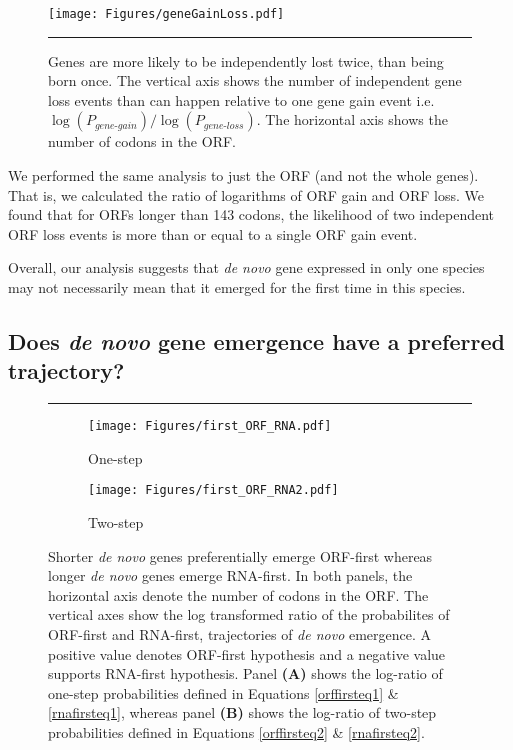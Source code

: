 \documentclass[12pt,a4paper]{article}
\begin{document}
\begin{figure}[!t]
\centering
\texttt{[image: Figures/geneGainLoss.pdf]}
\caption{Genes are more likely to be independently lost twice, than being born once. The vertical axis shows the number of independent gene loss events than can happen relative to one gene gain event i.e. $\log(P_\textit{gene-gain})/\log(P_\textit{gene-loss})$. The horizontal axis shows the number of codons in the ORF.}
\label{gainlossprob}

\vspace{1em}
\hrule
\end{figure}

We performed the same analysis to just the ORF (and not the whole genes). That is, we calculated the ratio of logarithms of ORF gain and ORF loss. We found that for ORFs longer than 143 codons, the likelihood of two independent ORF loss events is more than or equal to a single ORF gain event. 

Overall, our analysis suggests that \textit{de novo} gene expressed in only one species may not necessarily mean that it emerged for the first time in this species. 

\subsection{Does \textit{de novo} gene emergence have a preferred trajectory?}

\begin{figure}[!b]
\hrule
\vspace{1ex}
\centering
\begin{subfigure}{0.48\textwidth}
\centering
\caption{One-step}
\texttt{[image: Figures/first\_ORF\_RNA.pdf]}
\end{subfigure}\hfill%
\begin{subfigure}{0.48\textwidth}
\centering
\caption{Two-step}
\texttt{[image: Figures/first\_ORF\_RNA2.pdf]}
\end{subfigure}
\caption{Shorter \textit{de novo} genes preferentially emerge ORF-first whereas longer \textit{de novo} genes emerge RNA-first. In both panels, the horizontal axis denote the number of codons in the ORF. The vertical axes show the log transformed ratio of the probabilites of ORF-first and RNA-first, trajectories of \textit{de novo} emergence. A positive value denotes ORF-first hypothesis and a negative value supports RNA-first hypothesis.  Panel \textbf{(A)} shows the log-ratio of one-step probabilities defined in Equations \ref{orffirsteq1} \& \ref{rnafirsteq1}, whereas panel \textbf{(B)} shows the log-ratio of two-step probabilities defined in Equations \ref{orffirsteq2} \& \ref{rnafirsteq2}.}
\label{whoisfirst}
\end{figure}
\end{document}
